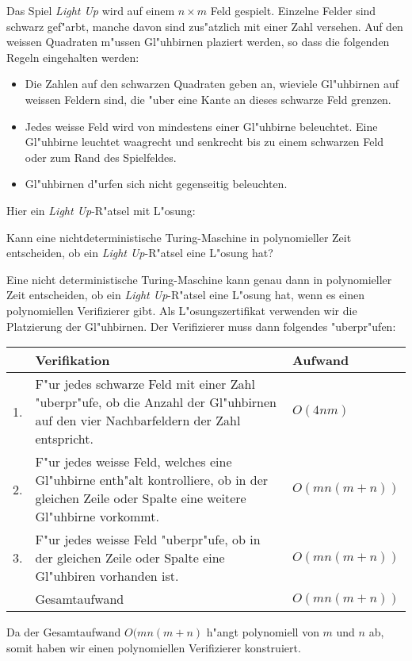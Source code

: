 Das Spiel {\em Light Up} wird auf einem $n\times m$ Feld gespielt.
Einzelne Felder sind schwarz gef"arbt, manche davon sind zus"atzlich
mit einer Zahl versehen.
Auf den weissen Quadraten m"ussen Gl"uhbirnen plaziert werden,
so dass die folgenden Regeln eingehalten werden: 
\begin{itemize}
\item
Die Zahlen auf den schwarzen Quadraten geben an, wieviele Gl"uhbirnen
auf weissen Feldern sind, die "uber eine Kante an dieses schwarze Feld grenzen. 
\item
Jedes weisse Feld wird von mindestens einer Gl"uhbirne beleuchtet.
Eine Gl"uhbirne leuchtet waagrecht und senkrecht bis zu einem schwarzen Feld
oder zum Rand des Spielfeldes. 
\item
Gl"uhbirnen d"urfen sich nicht gegenseitig beleuchten. 
\end{itemize}
Hier ein {\em Light Up}-R"atsel mit L"osung:
\begin{center}
\qquad
{}
\end{center}

Kann eine nichtdeterministische Turing-Maschine in polynomieller Zeit
entscheiden, ob ein {\em Light Up}-R"atsel eine L"osung hat?

\begin{loesung}
Eine nicht deterministische Turing-Maschine kann genau dann in polynomieller
Zeit entscheiden, ob ein {\em Light Up}-R"atsel eine L"osung hat,
wenn es einen polynomiellen Verifizierer gibt.
Als L"osungszertifikat verwenden wir die Platzierung der Gl"uhbirnen.
Der Verifizierer muss dann folgendes "uberpr"ufen:
\begin{center}
\begin{tabular}{rll}
  &Verifikation&Aufwand\\
\hline
1.&\begin{minipage}[t]{12cm}\strut
F"ur jedes schwarze Feld mit einer Zahl "uberpr"ufe, ob die Anzahl
der Gl"uhbirnen auf den vier Nachbarfeldern der Zahl entspricht.
\strut\end{minipage}&$O(4nm)$\\
2.&\begin{minipage}[t]{12cm}\strut
F"ur jedes weisse Feld, welches eine Gl"uhbirne enth"alt kontrolliere,
ob in der gleichen Zeile oder Spalte eine weitere Gl"uhbirne vorkommt.
\strut\end{minipage}&$O(mn(m+n))$\\
3.&\begin{minipage}[t]{12cm}\strut
F"ur jedes weisse Feld "uberpr"ufe, ob in der gleichen Zeile oder
Spalte eine Gl"uhbiren vorhanden ist.
\strut\end{minipage}&$O(mn(m+n))$\\
\hline
&Gesamtaufwand&$O(mn(m+n))$
\end{tabular}
\end{center}
Da der Gesamtaufwand $O(mn(m+n)$ h"angt polynomiell von $m$ und $n$
ab, somit haben wir einen polynomiellen Verifizierer konstruiert.
\end{loesung}

